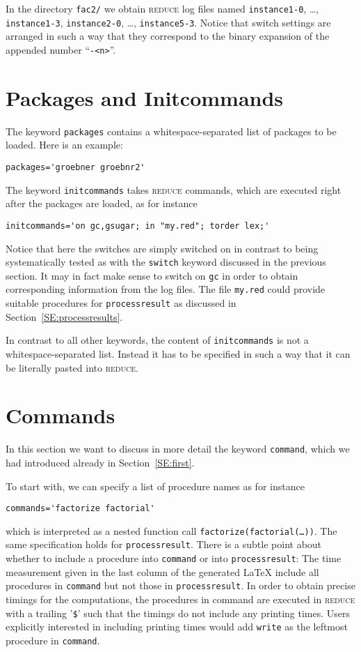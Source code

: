 \documentclass[a4paper]{article}
\begin{document}
In the directory \texttt{fac2/} we obtain \textsc{reduce} log files
named \texttt{instance1-0}, \dots, \texttt{instance1-3},
\texttt{instance2-0}, \dots, \texttt{instance5-3}. Notice that switch
settings are arranged in such a way that they correspond to the binary
expansion of the appended number ``\texttt{-<n>}''.

\section{Packages and Initcommands}
\label{SE:initcommands}
The keyword \texttt{packages} contains a whitespace-separated list of
packages to be loaded. Here is an example:
\begin{verbatim}
packages='groebner groebnr2'
\end{verbatim}
The keyword \texttt{initcommands} takes \textsc{reduce} commands,
which are executed right after the packages are loaded, as for
instance
\begin{verbatim}
initcommands='on gc,gsugar; in "my.red"; torder lex;'
\end{verbatim}
Notice that here the switches are simply switched on in contrast to
being systematically tested as with the \texttt{switch} keyword
discussed in the previous section. It may in fact make sense to switch
on \texttt{gc} in order to obtain corresponding information from the
log files. The file \texttt{my.red} could provide suitable procedures
for \texttt{processresult} as discussed in
Section~\ref{SE:processresults}.

In contrast to all other keywords, the content of
\texttt{initcommands} is not a white\-space-sep\-a\-rated list.
Instead it has to be specified in such a way that it can be literally
pasted into \textsc{reduce}.

\section{Commands}\label{SE:commands}
In this section we want to discuss in more detail the keyword
\texttt{command}, which we had introduced already in
Section~\ref{SE:first}.

To start with, we can specify a list of procedure names as for
instance
\begin{verbatim}
commands='factorize factorial'
\end{verbatim}
which is interpreted as a nested function call
\texttt{factorize(factorial(\dots))}. The same specification holds for
\texttt{processresult}. There is a subtle point about whether to
include a procedure into \texttt{command} or into
\texttt{processresult}: The time measurement given in the last column
of the generated \LaTeX{} include all procedures in \texttt{command}
but not those in \texttt{processresult}. In order to obtain precise
timings for the computations, the procedures in command are executed
in \textsc{reduce} with a trailing '\texttt{\$}' such that the timings
do not include any printing times. Users explicitly interested in
including printing times would add \texttt{write} as the leftmost
procedure in \texttt{command}.
\end{document}
